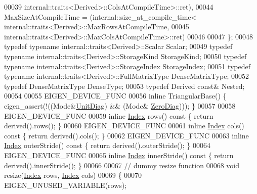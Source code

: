 \begin{DoxyCode}
00039                                                    internal::traits<Derived>::ColsAtCompileTime>::ret),
00044       MaxSizeAtCompileTime = (internal::size\_at\_compile\_time<
      internal::traits<Derived>::MaxRowsAtCompileTime,
00045                                                    internal::traits<Derived>::MaxColsAtCompileTime>::ret)
00046         
00047     \};
00048     \textcolor{keyword}{typedef} \textcolor{keyword}{typename} internal::traits<Derived>::Scalar Scalar;
00049     \textcolor{keyword}{typedef} \textcolor{keyword}{typename} internal::traits<Derived>::StorageKind StorageKind;
00050     \textcolor{keyword}{typedef} \textcolor{keyword}{typename} internal::traits<Derived>::StorageIndex StorageIndex;
00051     \textcolor{keyword}{typedef} \textcolor{keyword}{typename} internal::traits<Derived>::FullMatrixType DenseMatrixType;
00052     \textcolor{keyword}{typedef} DenseMatrixType DenseType;
00053     \textcolor{keyword}{typedef} Derived \textcolor{keyword}{const}& Nested;
00054 
00055     EIGEN\_DEVICE\_FUNC
00056     \textcolor{keyword}{inline} TriangularBase() \{ eigen\_assert(!((Mode&\hyperlink{group__enums_gga39e3366ff5554d731e7dc8bb642f83cdaddb72f888ac85d5a1c52333e54f9374b}{UnitDiag}) && (Mode&
      \hyperlink{group__enums_gga39e3366ff5554d731e7dc8bb642f83cda884ff7240392e85aa6e4b3c957e36483}{ZeroDiag}))); \}
00057 
00058     EIGEN\_DEVICE\_FUNC
00059     \textcolor{keyword}{inline} \hyperlink{namespace_eigen_a62e77e0933482dafde8fe197d9a2cfde}{Index} rows()\textcolor{keyword}{ const }\{ \textcolor{keywordflow}{return} derived().rows(); \}
00060     EIGEN\_DEVICE\_FUNC
00061     \textcolor{keyword}{inline} \hyperlink{namespace_eigen_a62e77e0933482dafde8fe197d9a2cfde}{Index} cols()\textcolor{keyword}{ const }\{ \textcolor{keywordflow}{return} derived().cols(); \}
00062     EIGEN\_DEVICE\_FUNC
00063     \textcolor{keyword}{inline} \hyperlink{namespace_eigen_a62e77e0933482dafde8fe197d9a2cfde}{Index} outerStride()\textcolor{keyword}{ const }\{ \textcolor{keywordflow}{return} derived().outerStride(); \}
00064     EIGEN\_DEVICE\_FUNC
00065     \textcolor{keyword}{inline} \hyperlink{namespace_eigen_a62e77e0933482dafde8fe197d9a2cfde}{Index} innerStride()\textcolor{keyword}{ const }\{ \textcolor{keywordflow}{return} derived().innerStride(); \}
00066     
00067     \textcolor{comment}{// dummy resize function}
00068     \textcolor{keywordtype}{void} resize(\hyperlink{namespace_eigen_a62e77e0933482dafde8fe197d9a2cfde}{Index} rows, \hyperlink{namespace_eigen_a62e77e0933482dafde8fe197d9a2cfde}{Index} cols)
00069     \{
00070       EIGEN\_UNUSED\_VARIABLE(rows);

\end{DoxyCode}
